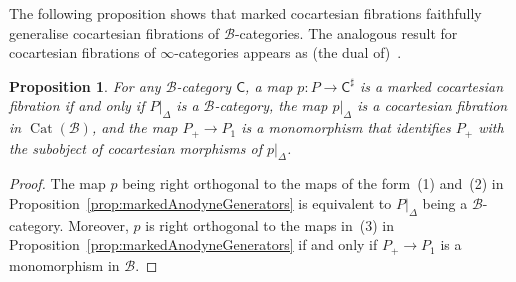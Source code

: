 \documentclass[reqno]{amsart}
\numberwithin{equation}{subsection}
\theoremstyle{plain}
\newtheorem{proposition}[equation]{Proposition}
\theoremstyle{definition}
\let\scr=\mathcal
\def\BB{\scr B}
\DeclareMathOperator{\Cat}{Cat}
\newcommand{\I}[1]{\mathsf{#1}}
\begin{document}
The following proposition shows that marked cocartesian fibrations faithfully generalise cocartesian fibrations of $\BB$-categories. The analogous result for cocartesian fibrations of $\infty$-categories appears as (the dual of)~\cite[Proposition~3.1.1.6]{htt}.
\begin{proposition}
	\label{prop:comparisonCocartesianFibrationMarkedUnmarked}
	For any $\BB$-category $\I{C}$, a map $p\colon P\to \I{C}^{\sharp}$ is a marked cocartesian fibration if and only if $P\vert_{\Delta}$ is a $\BB$-category, the map $p\vert_{\Delta}$ is a cocartesian fibration in $\Cat(\BB)$, and the map $P_+\to P_1$ is a monomorphism that identifies $P_+$ with the subobject of cocartesian morphisms of $p\vert_{\Delta}$.
\end{proposition}
\begin{proof}
	The map $p$ being right orthogonal to the maps of the form~(1) and~(2) in Proposition~\ref{prop:markedAnodyneGenerators} is equivalent to $P\vert_{\Delta}$ being a $\BB$-category.
	Moreover, $p$ is right orthogonal to the maps in~(3) in Proposition~\ref{prop:markedAnodyneGenerators} if and only if $P_+\to P_1$ is a monomorphism in $\BB$.
	

\end{proof}
\end{document}
